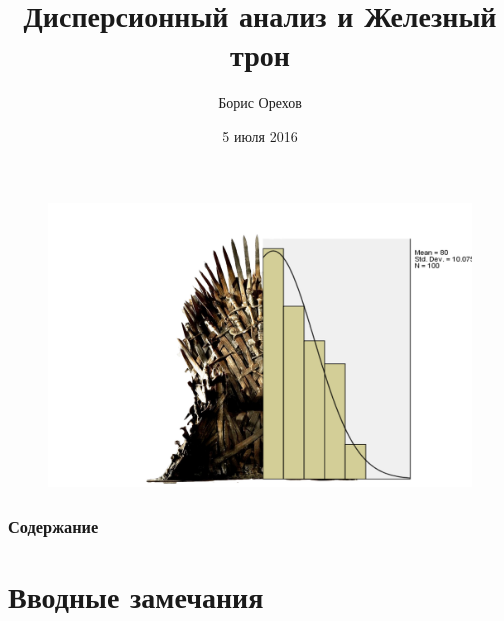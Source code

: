 \documentclass{beamer}
\title[Железный трон]{Дисперсионный анализ и Железный трон } %
\author{Борис Орехов} %
\institute[НИУ ВШЭ] %
{
НИУ Высшая школа экономики \\ %
\medskip
\textit{nevmenandr@gmail.com} %
}
\date{5 июля 2016} %
\begin{document}
\begin{frame}
\titlepage %
\end{frame}


\begin{frame}
\begin{figure}
\includegraphics[width=0.9\linewidth]{iron_throne_data_analysis}
\end{figure}
\end{frame}


\begin{frame}
\frametitle{Содержание} %
\tableofcontents %
\end{frame}


\section{Вводные замечания} %
\end{document}
